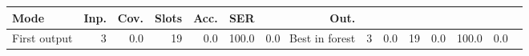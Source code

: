 \begin{tabular}{@{}lrrrrrr@{}}
\toprule
Mode & Inp. & Cov. & Slots & Acc. & SER & Out. \\
\midrule
First output & 3 & 0.0 & 19 & 0.0 & 100.0 & 0.0 \
Best in forest & 3 & 0.0 & 19 & 0.0 & 100.0 & 0.0 \
\bottomrule
\end{tabular}
